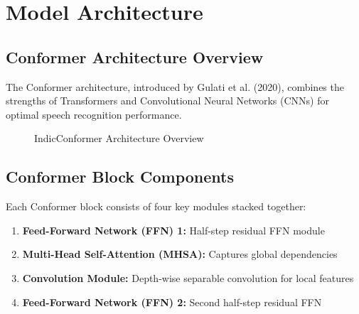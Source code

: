 \documentclass[12pt,a4paper]{article}
\begin{document}
\section{Model Architecture}

\subsection{Conformer Architecture Overview}

The Conformer architecture, introduced by Gulati et al. (2020), combines the strengths of Transformers and Convolutional Neural Networks (CNNs) for optimal speech recognition performance.

\begin{figure}[h]
\centering
{}
\caption{IndicConformer Architecture Overview}
\end{figure}

\subsection{Conformer Block Components}

Each Conformer block consists of four key modules stacked together:

\begin{enumerate}[leftmargin=*]
\item \textbf{Feed-Forward Network (FFN) 1:} Half-step residual FFN module
\item \textbf{Multi-Head Self-Attention (MHSA):} Captures global dependencies
\item \textbf{Convolution Module:} Depth-wise separable convolution for local features
\item \textbf{Feed-Forward Network (FFN) 2:} Second half-step residual FFN
\end{enumerate}
\end{document}
